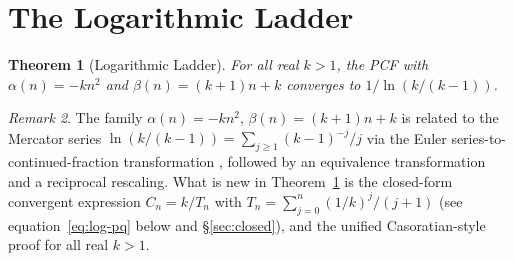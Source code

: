 \documentclass[11pt,a4paper]{article}
\theoremstyle{plain}
\newtheorem{theorem}{Theorem}[section]
\theoremstyle{definition}
\theoremstyle{remark}
\newtheorem{remark}[theorem]{Remark}
\begin{document}
\section{The Logarithmic Ladder}\label{sec:log}

\begin{theorem}[Logarithmic Ladder]\label{thm:log}
For all real $k > 1$, the PCF with
$\alpha(n) = -kn^2$ and $\beta(n) = (k{+}1)n + k$
converges to $1/\ln(k/(k{-}1))$.
\end{theorem}

\begin{remark}\label{rem:mercator}
The family $\alpha(n) = -kn^2$, $\beta(n) = (k{+}1)n + k$ is
related to the Mercator series
$\ln(k/(k{-}1)) = \sum_{j \ge 1} (k{-}1)^{-j}/j$ via the Euler
series-to-continued-fraction transformation
\cite[\S3.10(ii), eq.~(3.10.5)]{dlmf}, followed by an
equivalence transformation and a reciprocal rescaling. What
is new in Theorem~\ref{thm:log} is the closed-form convergent
expression $C_n = k/T_n$ with
$T_n = \sum_{j=0}^{n} (1/k)^j/(j{+}1)$
(see equation~\eqref{eq:log-pq} below and
\S\ref{sec:closed}), and the unified Casoratian-style proof
for all real $k>1$.
\end{remark}
\end{document}

